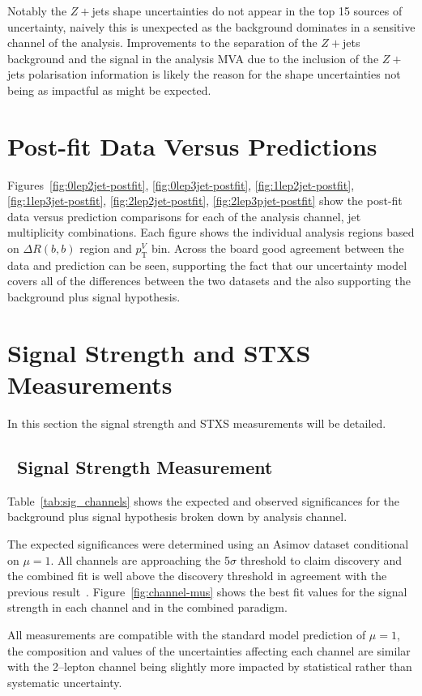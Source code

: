 Notably the $Z+$jets shape uncertainties do not appear in the top 15 sources of
uncertainty, naively this is unexpected as the background dominates in a
sensitive channel of the analysis. Improvements to the separation of the
$Z+$jets background and the signal in the analysis MVA due to the inclusion of
the $Z+$jets polarisation information is likely the reason for the shape
uncertainties not being as impactful as might be expected. 
\clearpage

\section{Post-fit Data Versus Predictions}
Figures~\ref{fig:0lep2jet-postfit}, \ref{fig:0lep3jet-postfit},
\ref{fig:1lep2jet-postfit}, \ref{fig:1lep3jet-postfit},
\ref{fig:2lep2jet-postfit}, \ref{fig:2lep3pjet-postfit} show the post-fit data
versus prediction comparisons for each of the analysis channel, jet multiplicity
combinations. Each figure shows the individual analysis regions based on
$\Delta R(b, b)$ region and $p_{\mathrm{T}}^V$ bin. Across the board good
agreement between the data and prediction can be seen, supporting the fact that
our uncertainty model covers all of the differences between the two datasets and
the also supporting the background plus signal hypothesis.







\clearpage

\section{Signal Strength and STXS Measurements}
In this section the signal strength and STXS measurements will be detailed.

\subsection{\VH\ Signal Strength Measurement}
Table~\ref{tab:sig_channels} shows the expected and observed significances for
the background plus signal hypothesis broken down by analysis channel.

The expected significances were determined using an Asimov dataset conditional
on $\mu=1$. All channels are approaching the 5$\sigma$ threshold to claim
discovery and the combined fit is well above the discovery threshold in
agreement with the previous result~\cite{vhbb-obs}. Figure~\ref{fig:channel-mus}
shows the best fit values for the signal strength in each channel and in the
combined paradigm.

All measurements are compatible with the standard model prediction of $\mu=1$,
the composition and values of the uncertainties affecting each channel are
similar with the 2--lepton channel being slightly more impacted by statistical
rather than systematic uncertainty.
%
\clearpage

